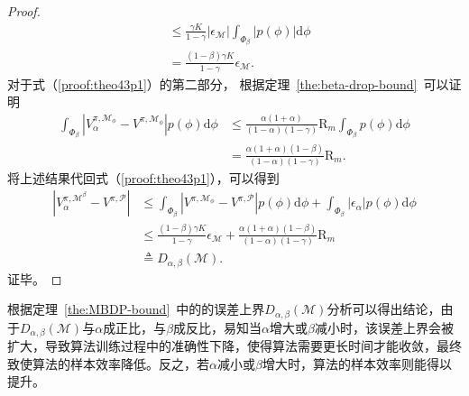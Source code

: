 \begin{proof}
\begin{equation}
\begin{aligned}
&\leq \frac{\gamma K}{1-\gamma}\left|\epsilon_{\mathcal{M}}\right|\int_{\Phi_\beta}\left|p(\phi)\right|\mathrm{d}\phi\\
&=\frac{(1-\beta)\gamma K}{1-\gamma}\epsilon_{\mathcal{M}}. \label{proof:theo43p2}
\end{aligned}
\end{equation}
对于式（\ref{proof:theo43p1}）的第二部分， 根据定理~\ref{the:beta-drop-bound}~可以证明
\begin{equation}
\begin{aligned}
\int_{\Phi_\beta}\left|{V}_\alpha^{\pi, \mathcal{M}_{\phi}} - {V}^{\pi,\mathcal{M}_{\phi}}\right|p(\phi)\mathrm{d}\phi&\leq \frac{\alpha(1+\alpha)}{(1-\alpha)(1-\gamma)}\mathrm{R}_m\int_{\Phi_\beta}p(\phi)\mathrm{d}\phi\\
&=\frac{\alpha(1+\alpha)(1-\beta)}{(1-\alpha)(1-\gamma)}\mathrm{R}_m. \label{proof:theo43p3}
\end{aligned}
\end{equation}
将上述结果代回式（\ref{proof:theo43p1}），可以得到
\begin{equation}
\begin{aligned}
\left|{V}_\alpha^{\pi, \mathcal{M}^\beta}-{V}^{\pi, \mathcal{P}}\right| &\leq \int_{\Phi_\beta}\left|{V}^{\pi, \mathcal{M}_{\phi}}-{V}^{\pi, \mathcal{P}}\right|p(\phi)\mathrm{d}\phi+\int_{\Phi_\beta}\left|\epsilon_\alpha\right|p(\phi)\mathrm{d}\phi\\
&\leq \frac{(1-\beta)\gamma K}{1-\gamma}\epsilon_{\mathcal{M}}+\frac{\alpha(1+\alpha)(1-\beta)}{(1-\alpha)(1-\gamma)}\mathrm{R}_m\\
&\triangleq D_{\alpha,\beta}(\mathcal{M}).
\end{aligned}
\end{equation}
证毕。
\end{proof}

根据定理~\ref{the:MBDP-bound}~中的的误差上界$D_{\alpha,\beta}(\mathcal{M})$分析可以得出结论，由于$D_{\alpha,\beta}(\mathcal{M})$与$\alpha$成正比，与$\beta$成反比，易知当$\alpha$增大或$\beta$减小时，该误差上界会被扩大，导致算法训练过程中的准确性下降，使得算法需要更长时间才能收敛，最终致使算法的样本效率降低。反之，若$\alpha$减小或$\beta$增大时，算法的样本效率则能得以提升。

